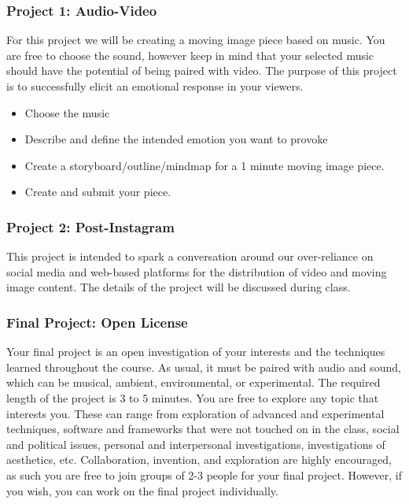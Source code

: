 \documentclass[10pt,letter,english]{article}
\begin{document}
\hypertarget{project-1}{%
      \subsubsection{Project 1: Audio-Video}\label{project-1}}

For this project we will be creating a moving image piece based on music. You are free to choose the sound, however keep in mind that your selected music should have the potential of being paired with video. The purpose of this project is to successfully elicit an emotional response in your viewers.

\begin{itemize}
      \item
            Choose the music
      \item
            Describe and define the intended emotion you want to provoke
      \item
            Create a storyboard/outline/mindmap for a 1 minute moving image piece.
      \item
            Create and submit your piece.
\end{itemize}

\hypertarget{project-2}{%
      \subsubsection{Project 2: Post-Instagram}\label{project-2}}

This project is intended to spark a conversation around our over-reliance on social media and web-based platforms for the distribution of video and moving image content. The details of the project will be discussed during class.

\hypertarget{final-project}{%
      \subsubsection{Final Project: Open License}\label{final-project}}

Your final project is an open investigation of your interests and the techniques learned throughout the course. As usual, it must be paired with audio and sound, which can be musical, ambient, environmental, or experimental. The required length of the project is 3 to 5 minutes. You are free to explore any topic that interests you. These can range from exploration of advanced and experimental techniques, software and frameworks that were not touched on in the class, social and political issues, personal and interpersonal investigations, investigations of aesthetics, etc. Collaboration, invention, and exploration are highly encouraged, as such you are free to join groups of 2-3 people for your final project. However, if you wish, you can work on the final project individually.
\end{document}
